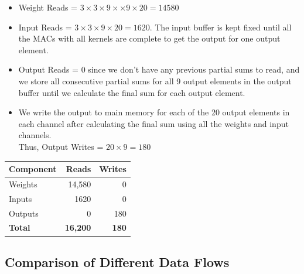 \documentclass{article}
\begin{document}
\begin{itemize}
    \item Weight Reads = $3 \times 3 \times 9 \times \times 9 \times 20 = 14580$
    \item Input Reads = $3 \times 3 \times 9 \times 20 = 1620$. The input buffer is kept fixed until all the MACs with all kernels are complete to get the output for one output element.
    \item Output Reads = $0$ since we don't have any previous partial sums to read, and we store all consecutive partial sums for all 9 output elements in the output buffer until we calculate the final sum for each output element.
    \item We write the output to main memory for each of the 20 output elements in each channel after calculating the final sum using all the weights and input channels.\\
    Thus, Output Writes = $20 \times 9 = 180$
\end{itemize}

\begin{table}[h]
\centering
    \begin{tabular}{|l|r|r|}
    \hline
    \textbf{Component} & \textbf{Reads} & \textbf{Writes} \\ \hline
    Weights            & 14,580          & 0               \\ \hline
    Inputs             & 1620         & 0               \\ \hline  
    Outputs            & 0              & 180            \\ \hline
    \textbf{Total}     & \textbf{16,200} & \textbf{180}     \\ \hline
    \end{tabular}
\end{table}

\subsection{Comparison of Different Data Flows}
\end{document}
